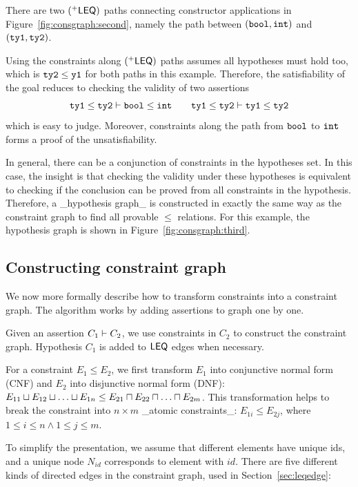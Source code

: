 There are two $(^{+}\mathsf{LEQ})$ paths connecting constructor
applications in Figure~\ref{fig:consgraph:second}, namely the path
between $(\mathtt{bool, int})$ and $(\mathtt{ty1, ty2})$. 

Using the constraints along $(^{+}\mathsf{LEQ})$ paths assumes all
hypotheses must hold too, which is $\mathtt{ty2}\leq \mathtt{y1}$ for
both paths in this example. Therefore, the satisfiability of the goal
reduces to checking the validity of two assertions 
%
\[\mathtt{ty1}\leq \mathtt{ty2}\vdash \mathtt{bool}\leq \mathtt{int}\qquad
\mathtt{ty1}\leq \mathtt{ty2}\vdash \mathtt{ty1}\leq \mathtt{ty2}\]
\noindent
which is easy to judge. Moreover, constraints along the path from
$\mathtt{bool}$ to $\mathtt{int}$ forms a proof of the unsatisfiability.

In general, there can be a conjunction of constraints in the
hypotheses set. In this case, the insight is that checking the
validity under these hypotheses is equivalent to checking if the
conclusion can be proved from all constraints in the hypothesis.
Therefore, a _hypothesis graph_ is constructed in exactly the same way
as the constraint graph to find all provable $\leq$ relations. For
this example, the hypothesis graph is shown in
Figure~\ref{fig:consgraph:third}. 

\subsection{Constructing constraint graph}
\label{sec:consgraph}

We now more formally describe how to transform constraints
into a constraint graph. The algorithm works by adding assertions to
graph one by one.

Given an assertion $C_1 \vdash C_2$, we use constraints in $C_2$ to
construct the constraint graph. Hypothesis $C_1$ is added to $\mathsf{LEQ}$
edges when necessary.

For a constraint $E_1 \leq E_2$, we first transform $E_1$ into
conjunctive normal form (CNF) and $E_2$ into disjunctive normal form
(DNF): $E_{11}\join E_{12} \join \dots \join E_{1n} \leq E_{21}\meet
E_{22} \meet \dots \meet E_{2m}$. This transformation helps to break
the constraint into $n\times m$ _atomic constraints_: $E_{1i}\leq
E_{2j}$, where $1\leq i\leq n \land 1\leq j\leq m$.

To simplify the presentation, we assume that different elements have
unique ids, and a unique node $N_{id}$ corresponds to element with
$id$. There are five different kinds of directed edges in the
constraint graph, used in Section~\ref{sec:leqedge}:

